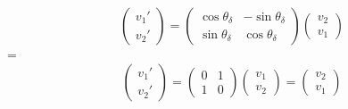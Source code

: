 \documentclass[a4paper,10pt]{article}
\begin{document}
\begin{equation}
\begin{pmatrix}
    v_1'\\
    v_2'
\end{pmatrix}
=
\begin{pmatrix}
    \cos \theta_\delta & -\sin \theta_\delta \\    
    \sin \theta_\delta& \cos \theta_\delta
\end{pmatrix}
\begin{pmatrix}
    v_2\\
    v_1
\end{pmatrix}
\end{equation}
=
\begin{equation}
\begin{pmatrix}
    v_1'\\
    v_2'
\end{pmatrix}
=
\begin{pmatrix}
    0 & 1 \\    
    1 & 0
\end{pmatrix}
\begin{pmatrix}
    v_1\\
    v_2
\end{pmatrix}
=
\begin{pmatrix}
    v_2\\
    v_1
\end{pmatrix}
\end{equation}
\end{document}
